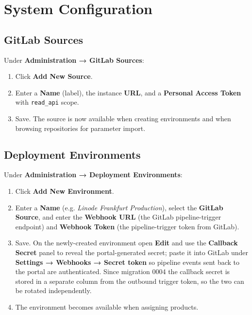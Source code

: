 \documentclass[12pt,a4paper,twoside]{report}
\newcommand{\code}[1]{\texttt{#1}}
\begin{document}
\chapter{System Configuration}
\label{ch:sysconfig}

\section{GitLab Sources}

Under \textbf{Administration → GitLab Sources}:

\begin{enumerate}
  \item Click \textbf{Add New Source}.
  \item Enter a \textbf{Name} (label), the instance \textbf{URL}, and
        a \textbf{Personal Access Token} with \code{read\_api} scope.
  \item Save. The source is now available when creating environments and
        when browsing repositories for parameter import.
\end{enumerate}

\section{Deployment Environments}

Under \textbf{Administration → Deployment Environments}:

\begin{enumerate}
  \item Click \textbf{Add New Environment}.
  \item Enter a \textbf{Name} (e.g. \textit{Linode Frankfurt Production}),
        select the \textbf{GitLab Source}, and enter the \textbf{Webhook URL}
        (the GitLab pipeline-trigger endpoint) and \textbf{Webhook Token}
        (the pipeline-trigger token from GitLab).
  \item Save. On the newly-created environment open \textbf{Edit} and use
        the \textbf{Callback Secret} panel to reveal the portal-generated
        secret; paste it into GitLab under \textbf{Settings → Webhooks →
        Secret token} so pipeline events sent back to the portal are
        authenticated. Since migration 0004 the callback secret is stored
        in a separate column from the outbound trigger token, so the two
        can be rotated independently.
  \item The environment becomes available when assigning products.
\end{enumerate}
\end{document}
